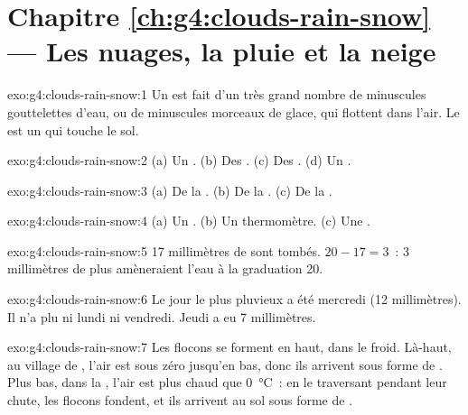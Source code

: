 \section*{Chapitre \ref{ch:g4:clouds-rain-snow} --- Les nuages, la pluie et la neige}

\begin{solution}{exo:g4:clouds-rain-snow:1}
Un  est fait d'un très grand nombre de minuscules gouttelettes d'eau,
ou de minuscules morceaux de glace, qui flottent dans l'air. Le 
est un  qui touche le sol.
\end{solution}

\begin{solution}{exo:g4:clouds-rain-snow:2}
(a) Un . (b) Des . (c) Des . (d) Un .
\end{solution}

\begin{solution}{exo:g4:clouds-rain-snow:3}
(a) De la . (b) De la . (c) De la .
\end{solution}

\begin{solution}{exo:g4:clouds-rain-snow:4}
(a) Un . (b) Un thermomètre. (c) Une .
\end{solution}

\begin{solution}{exo:g4:clouds-rain-snow:5}
17 millimètres de  sont tombés. $20 - 17 = 3$~: 3 millimètres de plus
amèneraient l'eau à la graduation 20.
\end{solution}

\begin{solution}{exo:g4:clouds-rain-snow:6}
Le jour le plus pluvieux a été mercredi (12 millimètres). Il n'a plu ni
lundi ni vendredi. Jeudi a eu 7 millimètres.
\end{solution}

\begin{solution}{exo:g4:clouds-rain-snow:7}
Les flocons se forment en haut, dans le  froid. Là-haut, au village de
, l'air est sous zéro jusqu'en bas, donc ils arrivent sous forme de
. Plus bas, dans la , l'air est plus chaud que \SI{0}{\celsius}~:
en le traversant pendant leur chute, les flocons fondent, et ils arrivent
au sol sous forme de .
\end{solution}

